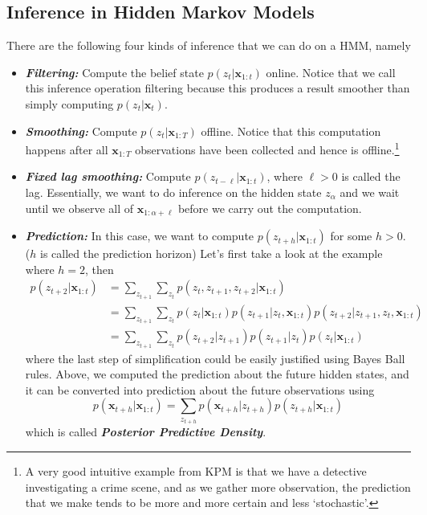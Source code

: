 \documentclass[11pt]{article}
\newcommand{\bx}{\mathbf{x}}
\begin{document}
\subsection{Inference in Hidden Markov Models}
There are the following four kinds of inference that we can do on a HMM, namely
\begin{itemize}
    \item \textit{\textbf{Filtering:}} Compute the belief state $p\left(z_{t} | \mathbf{x}_{1: t}\right)$ online. Notice that we call this inference operation filtering because this produces a result smoother than simply computing $p(z_t|\bx_{t})$.
    \item \textit{\textbf{Smoothing:}} Compute $p\left(z_{t} | \mathbf{x}_{1: T}\right)$ offline. Notice that this computation happens after all $\bx_{1:T}$ observations have been collected and hence is offline.\footnote{A very good intuitive example from KPM is that we have a detective investigating a crime scene, and as we gather more observation, the prediction that we make tends to be more and more certain and less `stochastic'.}
    \item \textit{\textbf{Fixed lag smoothing:}} Compute $p\left(z_{t-\ell} | \mathbf{x}_{1: t}\right)$, where $\ell>0$ is called the lag. Essentially, we want to do inference on the hidden state $z_\alpha$ and we wait until we observe all of $\bx_{1:\alpha + \ell}$ before we carry out the computation. 
    \item \textit{\textbf{Prediction:}} In this case, we want to compute $p\left(z_{t+h} | \mathbf{x}_{1: t}\right)$ for some $h > 0$. ($h$ is called the prediction horizon) Let's first take a look at the example where $h = 2$, then
    \begin{align*}
        p(z_{t+2}|\bx_{1:t}) 
        &= \sum_{z_{t+1}}\sum_{z_t}p(z_t, z_{t+1}, z_{t+2}|\bx_{1:t}) \\
        &= \sum_{z_{t+1}}\sum_{z_t}p(z_t |\bx_{1:t})p(z_{t+1}|z_t, \bx_{1:t})p(z_{t+2}|z_{t+1}, z_{t}, \bx_{1:t}) \\
        &= \sum_{z_{t+1}} \sum_{z_{t}} p\left(z_{t+2} | z_{t+1}\right) p\left(z_{t+1} | z_{t}\right) p\left(z_{t} | \mathbf{x}_{1: t}\right)
    \end{align*}
    where the last step of simplification could be easily justified using Bayes Ball rules. Above, we computed the prediction about the future hidden states, and it can be converted into prediction about the future observations using
    \begin{equation*}
        p\left(\mathbf{x}_{t+h} | \mathbf{x}_{1: t}\right)=\sum_{z_{t+h}} p\left(\mathbf{x}_{t+h} | z_{t+h}\right) p\left(z_{t+h} | \mathbf{x}_{1: t}\right)
    \end{equation*}
    which is called \textit{\textbf{Posterior Predictive Density}}.
\end{itemize}
\end{document}
